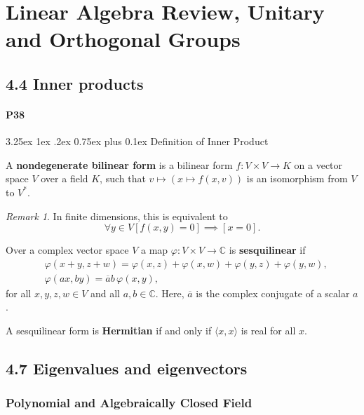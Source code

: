 \documentclass[12pt, letterpaper]{article}
\makeatletter
\renewcommand\subparagraph{\@startsection{subparagraph}{5}{\parindent}%
	{3.25ex \@plus1ex \@minus .2ex}%
	{0.75ex plus 0.1ex}%
	{\normalfont\normalsize\bfseries}}
\newcommand{\co}{\mathbb{C}}
\newcommand{\conj}{\overline}
\theoremstyle{definition}
\theoremstyle{remark}
\newtheorem*{rem*}{Remark}
\theoremstyle{definition}
\theoremstyle{plain}
\makeatother
\begin{document}
	\section{Linear Algebra Review, Unitary and Orthogonal Groups}
	\subsection*{4.4 Inner products}
	\paragraph{P38}
	\subparagraph{Definition of Inner Product}
	\begin{def*}
		A \textbf{nondegenerate bilinear form} is a bilinear form $f\colon V\times V\to K$
		on a vector space $V$ over a field $K$,
		such that $v\mapsto (x\mapsto f(x,v))$ is an isomorphism from $V$ to $V^*$.
	\end{def*}
	\begin{rem*}
		In finite dimensions, this is equivalent to
		\[\forall y \in V [f(x,y)=0] \implies [x=0].\]
	\end{rem*}
	\begin{def*}
		Over a complex vector space $V$ a map $\varphi \colon V\times V\to \co$ is \textbf{sesquilinear} if
		\[\begin{aligned}&\varphi (x+y,z+w)=\varphi (x,z)+\varphi (x,w)+\varphi (y,z)+\varphi (y,w),\\&\varphi (ax,by)={\conj {a}}b\,\varphi (x,y),\end{aligned}\]
		for all $x,y,z,w\in V$ and all $a,b\in \co$. Here, $\conj {a}$ is the complex conjugate of a scalar $a$.
	\end{def*}
	\begin{def*}
		A sesquilinear form is \textbf{Hermitian} if and only if $\langle x,x\rangle$ is real for all $x$.
	\end{def*}
	\subsection*{4.7 Eigenvalues and eigenvectors}
	\subsubsection*{Polynomial and Algebraically Closed Field}
	
\end{document}
